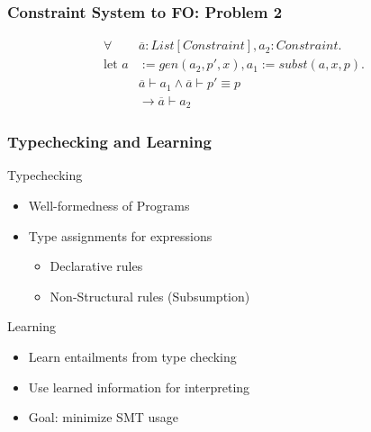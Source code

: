 \documentclass[leqno]{beamer}
\begin{document}
\begin{frame}
    \frametitle{Constraint System to FO: Problem 2}
    \begin{prooftree}
    \end{prooftree}
    \begin{align*}
    \forall &\overline{a}: List[Constraint], a_2: Constraint. \\
    \text{let } a &:= gen(a_2, p', x),
    a_1 := subst(a, x, p). \\
    & \overline{a} \vdash a_1 \land \overline{a} \vdash p' \equiv p \\
    & \rightarrow \overline{a} \vdash a_2
    \end{align*}
\end{frame}

\begin{frame}
    \frametitle{Typechecking and Learning}
    Typechecking
    \begin{itemize}
        \item Well-formedness of Programs
        \item Type assignments for expressions
        \begin{itemize}
            \item Declarative rules %
            \item Non-Structural rules (Subsumption)
        \end{itemize}
    \end{itemize}
    \vfill
    Learning
    \begin{itemize}
        \item Learn entailments from type checking
        \item Use learned information for interpreting
        \item Goal: minimize SMT usage
    \end{itemize}
\end{frame}

\end{document}
